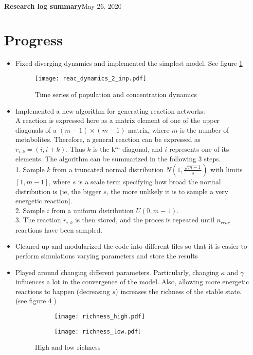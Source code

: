 \documentclass[10pt,letterpaper]{article}
\begin{document}
	
    \LARGE{\textbf{Research log summary}}\hfill\Large{May 26, 2020}
    \section*{Progress}
		\begin{itemize}
			\item Fixed diverging dynamics and implemented the simplest model. See figure \ref{fig:dynamics}
		
    	\begin{figure}[h]
    		\centering
    		\texttt{[image: reac\_dynamics\_2\_inp.pdf]}
    		\caption{Time series of population and concentration dynamics}
    		\label{fig:dynamics}
    	\end{figure}
    		\item Implemented a new algorithm for generating reaction networks:\\
    		A reaction is expressed here as a matrix element of one of the upper diagonals of a $ (m-1)\times(m-1) $ matrix, where $ m $ is the number of metabolites. Therefore, a general reaction can be expressed as $ r_{i,k} = (i, i+k) $. Thus $ k $ is the k$ ^{th} $ diagonal, and $ i $ represents one of its elements. The algorithm can be summarized in the following 3 steps.\\
			1. Sample $ k $  from  a truncated normal distribution $N(1,  \frac{\sqrt {m - 1}}{s})$ with limits $ [1, m-1] $, where $ s $ is a scale term specifying how broad the normal distribution is (ie, the bigger $ s $, the more unlikely it is to sample a very energetic reaction).\\
			2. Sample $ i $ from a uniform distribution $ U(0, m-1) $.\\
			3. The reaction $ r_{i,k} $ is then stored, and the proces is repeated until $ n_{reac} $ reactions have been sampled.\\
    	\item Cleaned-up and modularized the code into different files so that it is easier to perform simulations varying parameters and store the results\\
    	\item Played around changing different parameters. Particularly, changing $ \kappa $ and $ \gamma $ influences a lot in the convergence of the model. Also, allowing more energetic reactions to happen (decreasing $ s $) increases the richness of the stable state. (see figure \ref{fig:richnesss} )
    
	    \begin{figure}
	    	\centering
	    	\begin{subfigure}[b]{0.49\textwidth}
	    		\centering
	    		\texttt{[image: richness\_high.pdf]}
	    		\label{fig:y equals x}
	    	\end{subfigure}
	    	\hfill
	    	\begin{subfigure}[b]{0.49\textwidth}
	    		\centering
	    		\texttt{[image: richness\_low.pdf]}
	    		\label{fig:five over x}
	    	\end{subfigure}
	    	\caption{High and low richness}
	    	\label{fig:richnesss}
	    \end{figure}
    \end{itemize}
\end{document}

